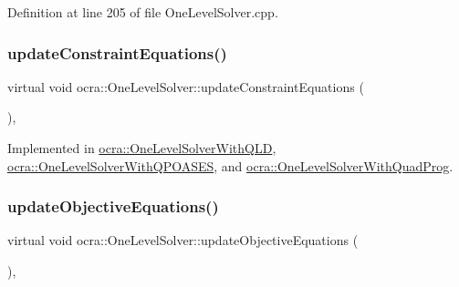 Definition at line 205 of file One\+Level\+Solver.\+cpp.

\hypertarget{classocra_1_1OneLevelSolver_af592dc713af6cf22e67abcdfba09ca5e}{}\label{classocra_1_1OneLevelSolver_af592dc713af6cf22e67abcdfba09ca5e} 
\subsubsection{\texorpdfstring{update\+Constraint\+Equations()}{updateConstraintEquations()}}
{\footnotesize\ttfamily virtual void ocra\+::\+One\+Level\+Solver\+::update\+Constraint\+Equations (\begin{DoxyParamCaption}{ }\end{DoxyParamCaption})\hspace{0.3cm}{\ttfamily [protected]}, {}}



Implemented in \hyperlink{classocra_1_1OneLevelSolverWithQLD_abc304c0e5f9234ca4230f7b67b02a0c0}{ocra\+::\+One\+Level\+Solver\+With\+Q\+LD}, \hyperlink{classocra_1_1OneLevelSolverWithQPOASES_abbe458ba193d545d6c07b09f582d6ce7}{ocra\+::\+One\+Level\+Solver\+With\+Q\+P\+O\+A\+S\+ES}, and \hyperlink{classocra_1_1OneLevelSolverWithQuadProg_a0276b1005f8b5812b313aa594d01118a}{ocra\+::\+One\+Level\+Solver\+With\+Quad\+Prog}.

\hypertarget{classocra_1_1OneLevelSolver_a150b377a35e30ae9c347147c10fddb33}{}\label{classocra_1_1OneLevelSolver_a150b377a35e30ae9c347147c10fddb33} 
\subsubsection{\texorpdfstring{update\+Objective\+Equations()}{updateObjectiveEquations()}}
{\footnotesize\ttfamily virtual void ocra\+::\+One\+Level\+Solver\+::update\+Objective\+Equations (\begin{DoxyParamCaption}{ }\end{DoxyParamCaption})\hspace{0.3cm}{\ttfamily [protected]}, {}}



